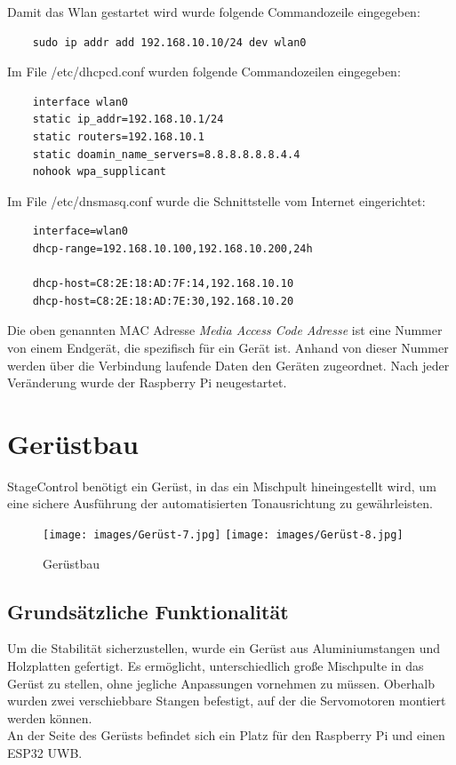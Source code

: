 \newpage
Damit das Wlan gestartet wird wurde folgende Commandozeile eingegeben: 
\begin{lstlisting}
	sudo ip addr add 192.168.10.10/24 dev wlan0 
\end{lstlisting}

Im File /etc/dhcpcd.conf wurden folgende Commandozeilen eingegeben: 
\begin{lstlisting}
	interface wlan0
	static ip_addr=192.168.10.1/24
	static routers=192.168.10.1
	static doamin_name_servers=8.8.8.8.8.8.4.4
	nohook wpa_supplicant
\end{lstlisting}

Im File /etc/dnsmasq.conf wurde die Schnittstelle vom Internet eingerichtet:
\begin{lstlisting}
	interface=wlan0
	dhcp-range=192.168.10.100,192.168.10.200,24h
	
	dhcp-host=C8:2E:18:AD:7F:14,192.168.10.10
	dhcp-host=C8:2E:18:AD:7E:30,192.168.10.20
\end{lstlisting} 

Die oben genannten MAC Adresse \textit{Media Access Code Adresse} ist eine Nummer von einem Endgerät, die spezifisch für ein Gerät ist. Anhand von dieser Nummer werden über die Verbindung laufende Daten den Geräten zugeordnet. Nach jeder Veränderung wurde der Raspberry Pi neugestartet. 

\newpage
\section{Gerüstbau}
StageControl benötigt ein Gerüst, in das ein Mischpult hineingestellt wird, um eine sichere Ausführung der automatisierten Tonausrichtung zu gewährleisten. 


\begin{figure}[H]
	\centering
	\texttt{[image: images/Gerüst-7.jpg]}
	\texttt{[image: images/Gerüst-8.jpg]}
	\caption[Gerüstbau]{Gerüstbau}
	\label{fig:Gerüstbau}
\end{figure}

\newpage
\subsection{Grundsätzliche Funktionalität}
Um die Stabilität sicherzustellen, wurde ein Gerüst aus Aluminiumstangen und Holzplatten gefertigt. Es ermöglicht, unterschiedlich große Mischpulte in das Gerüst zu stellen, ohne jegliche Anpassungen vornehmen zu müssen. Oberhalb wurden zwei verschiebbare Stangen befestigt, auf der die Servomotoren montiert werden können.\\
An der Seite des Gerüsts befindet sich ein Platz für den Raspberry Pi und einen ESP32 UWB.

